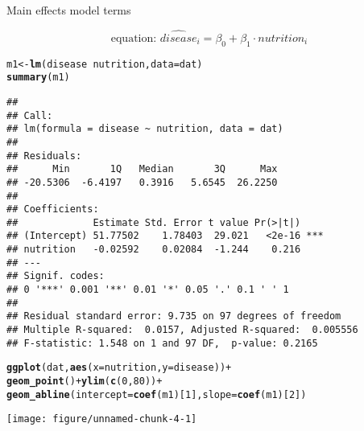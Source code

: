\documentclass[table]{beamer}\usepackage[]{graphicx}\usepackage[]{color}
\makeatletter
\def\maxwidth{ %
  \ifdim\Gin@nat@width>\linewidth
    \linewidth
  \else
    \Gin@nat@width
  \fi
}
\newcommand{\hlnum}[1]{\textcolor[rgb]{0.686,0.059,0.569}{#1}}%
\newcommand{\hlopt}[1]{\textcolor[rgb]{0,0,0}{#1}}%
\newcommand{\hlstd}[1]{\textcolor[rgb]{0.345,0.345,0.345}{#1}}%
\newcommand{\hlkwb}[1]{\textcolor[rgb]{0.69,0.353,0.396}{#1}}%
\newcommand{\hlkwc}[1]{\textcolor[rgb]{0.333,0.667,0.333}{#1}}%
\newcommand{\hlkwd}[1]{\textcolor[rgb]{0.737,0.353,0.396}{\textbf{#1}}}%
\newenvironment{kframe}{%
 \def\at@end@of@kframe{}%
 \ifinner\ifhmode%
  \def\at@end@of@kframe{\end{minipage}}%
  \begin{minipage}{\columnwidth}%
 \fi\fi%
 \def\FrameCommand##1{\hskip\@totalleftmargin \hskip-\fboxsep
 \colorbox{shadecolor}{##1}\hskip-\fboxsep
     \hskip-\linewidth \hskip-\@totalleftmargin \hskip\columnwidth}%
 \MakeFramed {\advance\hsize-\width
   \@totalleftmargin\z@ \linewidth\hsize
   \@setminipage}}%
 {\par\unskip\endMakeFramed%
 \at@end@of@kframe}
\newenvironment{knitrout}{}{} %
\makeatother
\begin{document}
\begin{frame}[fragile]{Main effects model terms}

$$ \mbox{equation: \ }  \widehat{disease}_i = \beta_0 + \beta_1\cdot nutrition_i $$

\begin{knitrout}\scriptsize
{}\color{fgcolor}\begin{kframe}
\begin{alltt}
\hlstd{m1} \hlkwb{<-} \hlkwd{lm}\hlstd{(disease} \hlopt{~} \hlstd{nutrition,} \hlkwc{data}\hlstd{=dat)}
\hlkwd{summary}\hlstd{(m1)}
\end{alltt}
\begin{verbatim}
## 
## Call:
## lm(formula = disease ~ nutrition, data = dat)
## 
## Residuals:
##      Min       1Q   Median       3Q      Max 
## -20.5306  -6.4197   0.3916   5.6545  26.2250 
## 
## Coefficients:
##             Estimate Std. Error t value Pr(>|t|)    
## (Intercept) 51.77502    1.78403  29.021   <2e-16 ***
## nutrition   -0.02592    0.02084  -1.244    0.216    
## ---
## Signif. codes:  
## 0 '***' 0.001 '**' 0.01 '*' 0.05 '.' 0.1 ' ' 1
## 
## Residual standard error: 9.735 on 97 degrees of freedom
## Multiple R-squared:  0.0157,	Adjusted R-squared:  0.005556 
## F-statistic: 1.548 on 1 and 97 DF,  p-value: 0.2165
\end{verbatim}
\end{kframe}
\end{knitrout}

\begin{knitrout}\scriptsize
{}\color{fgcolor}\begin{kframe}
\begin{alltt}
\hlkwd{ggplot}\hlstd{(dat,} \hlkwd{aes}\hlstd{(}\hlkwc{x}\hlstd{=nutrition,} \hlkwc{y}\hlstd{=disease))} \hlopt{+}
  \hlkwd{geom_point}\hlstd{()} \hlopt{+} \hlkwd{ylim}\hlstd{(}\hlkwd{c}\hlstd{(}\hlnum{0}\hlstd{,}\hlnum{80}\hlstd{))} \hlopt{+}
  \hlkwd{geom_abline}\hlstd{(}\hlkwc{intercept} \hlstd{=} \hlkwd{coef}\hlstd{(m1)[}\hlnum{1}\hlstd{],} \hlkwc{slope} \hlstd{=} \hlkwd{coef}\hlstd{(m1)[}\hlnum{2}\hlstd{])}
\end{alltt}
\end{kframe}
\texttt{[image: figure/unnamed-chunk-4-1]} 
\end{knitrout}


\end{frame}


\end{document}
